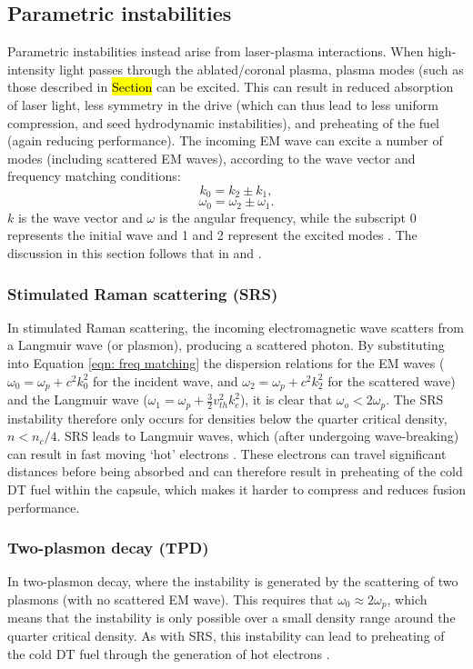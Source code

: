 \subsection{Parametric instabilities} \label{Parametric instabilities}
Parametric instabilities instead arise from laser-plasma interactions. When high-intensity light passes through the ablated/coronal plasma, plasma modes (such as those described in \hl{Section} can be excited. This can result in reduced absorption of laser light, less symmetry in the drive (which can thus lead to less uniform compression, and seed hydrodynamic instabilities), and preheating of the fuel (again reducing performance). The incoming EM wave can excite a number of modes (including scattered EM waves), according to the wave vector and frequency matching conditions:
\begin{equation} k_0 = k_2 \pm k_1, \end{equation}
\begin{equation} \omega_0 = \omega_2 \pm \omega_1. \label{eqn: freq matching} \end{equation}
$k$ is the wave vector and $\omega$ is the angular frequency, while the subscript 0 represents the initial wave and 1 and 2 represent the excited modes \cite{Chen2016}. The discussion in this section follows that in \cite{Chen2016} and \cite{Craxton2015}.

\subsubsection{Stimulated Raman scattering (SRS)}
In stimulated Raman scattering, the incoming electromagnetic wave scatters from a Langmuir wave (or plasmon), producing a scattered photon. By substituting into Equation \ref{eqn: freq matching} the dispersion relations for the EM waves ($\omega_0 = \omega_p + c^2 k_0^2$ for the incident wave, and $\omega_2 = \omega_p + c^2 k_2^2$ for the scattered wave) and the Langmuir wave ($\omega_1 = \omega_p + \frac{3}{2} v_{th}^2 k_e^2$), it is clear that $\omega_o < 2 \omega_p$. The SRS instability therefore only occurs for densities below the quarter critical density, $n < n_c / 4$. SRS  leads to Langmuir waves, which (after undergoing wave-breaking) can result in fast moving `hot' electrons \cite{Rosenberg2018}. These electrons can travel significant distances before being absorbed and can therefore result in preheating of the cold DT fuel within the capsule, which makes it harder to compress and reduces fusion performance.

\subsubsection{Two-plasmon decay (TPD)}
In two-plasmon decay, where the instability is generated by the scattering of two plasmons (with no scattered EM wave). This requires that $\omega_0 \approx 2\omega_p$, which means that the instability is only possible over a small density range around the quarter critical density. As with SRS, this instability can lead to preheating of the cold DT fuel through the generation of hot electrons \cite{Yaakobi2000}.

